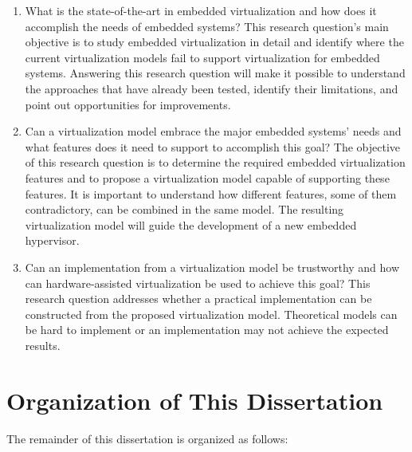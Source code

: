\begin{enumerate}
  \item What is the state-of-the-art in embedded virtualization and how does it accomplish the needs of  embedded systems? This research question’s main objective is to study embedded virtualization in detail and identify where the current virtualization models fail to support virtualization for embedded systems.  Answering this research question will make it possible to understand the approaches that have already been tested, identify their limitations, and point out opportunities for improvements.

  \item Can a virtualization model embrace the major embedded systems’ needs and what features does it need to support to accomplish this goal? The objective of this research question is to determine the required embedded virtualization features and to propose a virtualization model capable of supporting these features. It is important to understand how different features, some of them contradictory, can be combined in the same model. The resulting virtualization model will guide the development of a new embedded hypervisor.
  
  \item Can an implementation from a virtualization model be trustworthy and how can hardware-assisted virtualization be used to achieve this goal? This research question addresses whether  a practical implementation can be constructed from the proposed virtualization model. Theoretical models can be hard to implement or an implementation may not achieve the expected results. 

\end{enumerate}


\section{Organization of This Dissertation}

The remainder of this dissertation is organized as follows:

